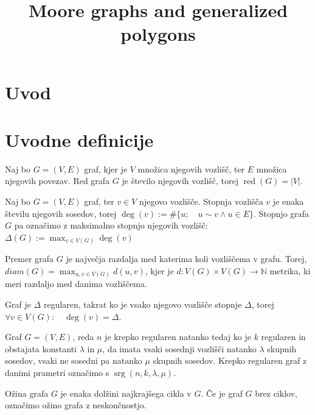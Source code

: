 \documentclass[fin1, tisk]{fmfdelo}
\title{Moore graphs and generalized polygons}
\newcommand{\red}{\operatorname{red}}
\newcommand{\srg}{\operatorname{srg}}
\newcommand{\diam}{diam}
\newcommand{\N}{\mathbb{N}}
\begin{document}
\section{Uvod}

\section{Uvodne definicije}
\begin{definicija}
Naj bo $G = (V, E)$ graf, kjer je $V$ množica njegovih
vozlišč, ter $E$ množica njegovih povezav. Red grafa $G$ je 
število njegovih vozlišč, torej $\red(G) = |V|$.
\end{definicija}

\begin{definicija}
Naj bo $G = (V, E)$ graf, ter $v \in V$ njegovo vozlišče. 
Stopnja vozlišča $v$ je enaka številu njegovih sosedov, torej
$\deg(v) := \#\{u; \quad u \sim v \land u \in E\}$. Stopnjo 
grafa $G$ pa označimo z maksimalno stopnjo njegovih vozlišč:
$\Delta(G) := \max_{v \in V(G)} \deg(v)$
\end{definicija}

\begin{definicija}
Premer grafa $G$ je največja razdalja med katerima koli 
vozliščema v grafu. Torej, $\diam(G) = \max_{u, v \in V(G)} d(u, v)$, 
kjer je $d : V(G) \times V(G) \rightarrow \N$ metrika, ki meri  
razdaljo med danima vozliščema. 
\end{definicija}

\begin{definicija}
Graf je $\Delta$ regularen, takrat ko je vsako njegovo vozlišče 
stopnje $\Delta$, torej $\forall v \in V(G): \quad \deg(v) = \Delta$.
\end{definicija}

\begin{definicija}
Graf $G = (V, E)$, reda $n$ je krepko regularen natanko tedaj ko je $k$ regularen 
in obstajata 
konstanti $\lambda$ in $\mu$, da imata vsaki sosednji vozlišči 
natanko $\lambda$ skupnih sosedov, vsaki  ne sosedni pa natanko 
$\mu$ skupnih sosedov. Krepko regularen graf z danimi prametri 
označimo s $\srg(n, k, \lambda, \mu)$.
\end{definicija}

\begin{definicija}
Ožina grafa $G$ je enaka dolžini najkrajšega cikla v $G$. Če je graf 
$G$ brez ciklov, označimo ožino grafa z neskončnostjo.
\end{definicija}
\end{document}
